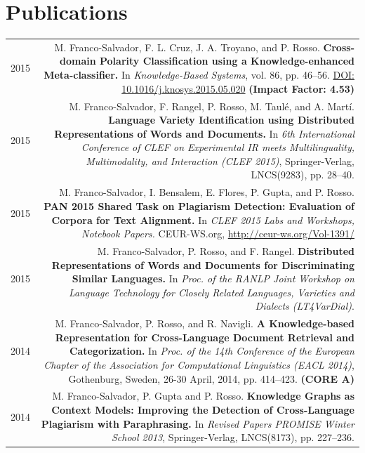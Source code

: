 \documentclass[10pt]{article}
\begin{document}
\section*{Publications}
\begin{tabular}{L!{\VRule}R}
	2015&M. Franco-Salvador, F. L. Cruz, J. A. Troyano, and P. Rosso. \textbf{Cross-domain Polarity Classification using a Knowledge-enhanced Meta-classifier.}
	In \emph{Knowledge-Based Systems}, vol. 86, pp. 46--56. \href{http://dx.doi.org/10.1016/j.knosys.2015.05.020}{DOI: 10.1016/j.knosys.2015.05.020} \textbf{(Impact Factor: 4.53)} \vspace{5pt}\\
	2015&M. Franco-Salvador, F. Rangel, P. Rosso, M. Taul{\'e}, and A. Mart{\'i}. \textbf{Language Variety Identification using Distributed Representations of Words and Documents.}
	In \emph{6th International Conference of CLEF on Experimental IR meets Multilinguality, Multimodality, and Interaction (CLEF 2015)}, Springer-Verlag, LNCS(9283), pp. 
28--40. \vspace{5pt}\\
	2015&M. Franco-Salvador, I. Bensalem, E. Flores, P. Gupta, and P. Rosso. \textbf{PAN 2015 Shared Task on Plagiarism Detection: Evaluation of Corpora for Text Alignment.}
	In \emph{CLEF 2015 Labs and Workshops, Notebook Papers.} CEUR-WS.org, \href{http://ceur-ws.org/Vol-1391/}{http://ceur-ws.org/Vol-1391/} \vspace{5pt}\\
	2015&M. Franco-Salvador, P. Rosso, and F. Rangel. \textbf{Distributed Representations of Words and Documents for Discriminating Similar Languages.}
	In \emph{Proc. of the RANLP Joint Workshop on Language Technology for Closely Related Languages, Varieties and Dialects (LT4VarDial)}. \vspace{5pt}\\
	2014&M. Franco-Salvador, P. Rosso, and R. Navigli. \textbf{A Knowledge-based Representation for Cross-Language Document Retrieval and Categorization.}
	In \emph{Proc. of the 14th Conference of the European Chapter of the Association for Computational Linguistics (EACL 2014)}, Gothenburg, Sweden, 26-30 April, 2014, pp. 414--423. \textbf{(CORE A)} \vspace{5pt}\\
	2014&M. Franco-Salvador, P. Gupta and P. Rosso. \textbf{Knowledge Graphs as Context Models: Improving the Detection of Cross-Language Plagiarism with Paraphrasing.}
	In \emph{Revised Papers PROMISE Winter School 2013}, Springer-Verlag, LNCS(8173), pp. 227--236.\vspace{5pt}\\

\end{tabular}
\end{document}
